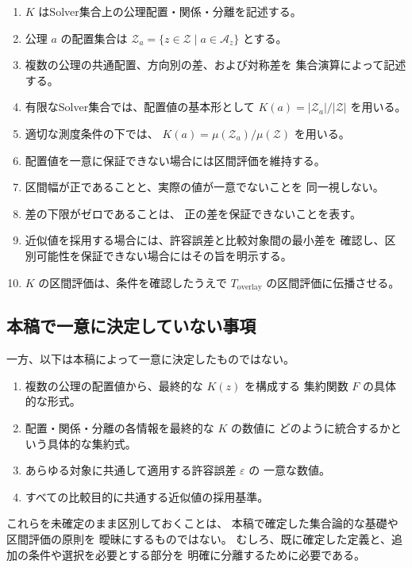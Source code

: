 \documentclass[a4paper,12pt]{article}
\begin{document}
\begin{enumerate}[label=(\arabic*)]
    \item $K$ はSolver集合上の公理配置・関係・分離を記述する。
    \item 公理 $a$ の配置集合は
    $\mathcal{Z}_a=\{z\in\mathcal{Z}\mid a\in\mathcal{A}_z\}$
    とする。
    \item 複数の公理の共通配置、方向別の差、および対称差を
    集合演算によって記述する。
    \item 有限なSolver集合では、配置値の基本形として
    $K(a)=|\mathcal{Z}_a|/|\mathcal{Z}|$ を用いる。
    \item 適切な測度条件の下では、
    $K(a)=\mu(\mathcal{Z}_a)/\mu(\mathcal{Z})$ を用いる。
    \item 配置値を一意に保証できない場合には区間評価を維持する。
    \item 区間幅が正であることと、実際の値が一意でないことを
    同一視しない。
    \item 差の下限がゼロであることは、
    正の差を保証できないことを表す。
    \item 近似値を採用する場合には、許容誤差と比較対象間の最小差を
    確認し、区別可能性を保証できない場合にはその旨を明示する。
    \item $K$ の区間評価は、条件を確認したうえで
    $T_{\mathrm{overlay}}$ の区間評価に伝播させる。
\end{enumerate}

\subsection{本稿で一意に決定していない事項}

一方、以下は本稿によって一意に決定したものではない。

\begin{enumerate}[label=(\arabic*)]
    \item 複数の公理の配置値から、最終的な $K(z)$ を構成する
    集約関数 $F$ の具体的な形式。
    \item 配置・関係・分離の各情報を最終的な $K$ の数値に
    どのように統合するかという具体的な集約式。
    \item あらゆる対象に共通して適用する許容誤差 $\varepsilon$ の
    一意な数値。
    \item すべての比較目的に共通する近似値の採用基準。
\end{enumerate}

これらを未確定のまま区別しておくことは、
本稿で確定した集合論的な基礎や区間評価の原則を
曖昧にするものではない。
むしろ、既に確定した定義と、追加の条件や選択を必要とする部分を
明確に分離するために必要である。
\end{document}
